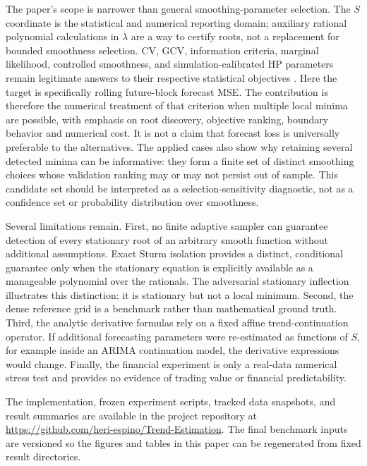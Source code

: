 \documentclass[english]{smcca}
\begin{document}
The paper's scope is narrower than general smoothing-parameter selection. The $S$ coordinate is the statistical and numerical reporting domain; auxiliary rational polynomial calculations in $\lambda$ are a way to certify roots, not a replacement for bounded smoothness selection. CV, GCV, information criteria, marginal likelihood, controlled smoothness, and simulation-calibrated HP parameters remain legitimate answers to their respective statistical objectives \cite{craven1979gcv,guerrero2008smoothness,cortes2017smoothness,biessy2026wh,franke2026hp}. Here the target is specifically rolling future-block forecast MSE. The contribution is therefore the numerical treatment of that criterion when multiple local minima are possible, with emphasis on root discovery, objective ranking, boundary behavior and numerical cost. It is not a claim that forecast loss is universally preferable to the alternatives. The applied cases also show why retaining several detected minima can be informative: they form a finite set of distinct smoothing choices whose validation ranking may or may not persist out of sample. This candidate set should be interpreted as a selection-sensitivity diagnostic, not as a confidence set or probability distribution over smoothness.

Several limitations remain. First, no finite adaptive sampler can guarantee detection of every stationary root of an arbitrary smooth function without additional assumptions. Exact Sturm isolation provides a distinct, conditional guarantee only when the stationary equation is explicitly available as a manageable polynomial over the rationals. The adversarial stationary inflection illustrates this distinction: it is stationary but not a local minimum. Second, the dense reference grid is a benchmark rather than mathematical ground truth. Third, the analytic derivative formulas rely on a fixed affine trend-continuation operator. If additional forecasting parameters were re-estimated as functions of \(S\), for example inside an ARIMA continuation model, the derivative expressions would change. Finally, the financial experiment is only a real-data numerical stress test and provides no evidence of trading value or financial predictability.

The implementation, frozen experiment scripts, tracked data snapshots, and result summaries are available in the project repository at \url{https://github.com/heri-espino/Trend-Estimation}. The final benchmark inputs are versioned so the figures and tables in this paper can be regenerated from fixed result directories.
\end{document}
